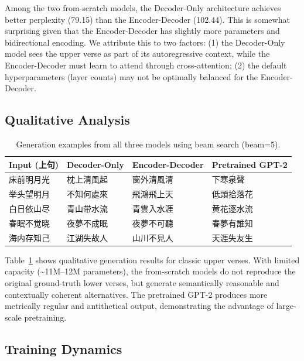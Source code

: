 \documentclass[11pt,a4paper]{article}
\begin{document}
Among the two from-scratch models, the Decoder-Only architecture achieves
better perplexity (79.15) than the Encoder-Decoder (102.44).
This is somewhat surprising given that the Encoder-Decoder has slightly more
parameters and bidirectional encoding.
We attribute this to two factors:
(1) the Decoder-Only model sees the upper verse as part of its autoregressive
context, while the Encoder-Decoder must learn to attend through
cross-attention;
(2) the default hyperparameters (layer counts) may not be optimally balanced
for the Encoder-Decoder.

\subsection{Qualitative Analysis}

\begin{table}[H]
\centering
\small
\renewcommand{\arraystretch}{1.2}
\caption{Generation examples from all three models using beam search
         (beam=5).}
\label{tab:examples}
\begin{tabular}{p{2.5cm}p{3.2cm}p{3.2cm}p{3.2cm}}
\toprule
\textbf{Input (上句)} & \textbf{Decoder-Only} & \textbf{Encoder-Decoder} & \textbf{Pretrained GPT-2} \\
\midrule
床前明月光      & 枕上清風起    & 窗外清風清    & 下寒泉聲 \\
举头望明月      & 不知何處來    & 飛鴻飛上天    & 低頭拾落花 \\
白日依山尽      & 青山带水流    & 青雲入水涯    & 黄花逐水流 \\
春眠不觉晓      & 夜夢不成眠    & 夜夢不可聽    & 春夢有誰知 \\
海内存知己      & 江湖失故人    & 山川不見人    & 天涯失友生 \\
\bottomrule
\end{tabular}
\end{table}

Table~\ref{tab:examples} shows qualitative generation results for classic
upper verses.
With limited capacity (\textasciitilde{}11M--12M parameters), the from-scratch
models do not reproduce the original ground-truth lower verses, but generate
semantically reasonable and contextually coherent alternatives.
The pretrained GPT-2 produces more metrically regular and antithetical output,
demonstrating the advantage of large-scale pretraining.

\subsection{Training Dynamics}
\end{document}
